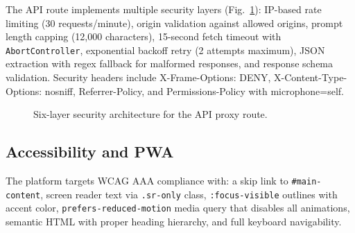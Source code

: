 \documentclass[11pt]{article}
\begin{document}
The API route implements multiple security layers (Fig.~\ref{fig:security}): IP-based rate limiting (30 requests/minute), origin validation against allowed origins, prompt length capping (12,000 characters), 15-second fetch timeout with \texttt{AbortController}, exponential backoff retry (2 attempts maximum), JSON extraction with regex fallback for malformed responses, and response schema validation. Security headers include X-Frame-Options: DENY, X-Content-Type-Options: nosniff, Referrer-Policy, and Permissions-Policy with microphone=self.

\begin{figure}[!t]
\centering
{}
\caption{Six-layer security architecture for the API proxy route.}
\label{fig:security}
\end{figure}

\subsection{Accessibility and PWA}

The platform targets WCAG AAA compliance with: a skip link to \texttt{\#main-content}, screen reader text via \texttt{.sr-only} class, \texttt{:focus-visible} outlines with accent color, \texttt{prefers-reduced-motion} media query that disables all animations, semantic HTML with proper heading hierarchy, and full keyboard navigability.
\end{document}
